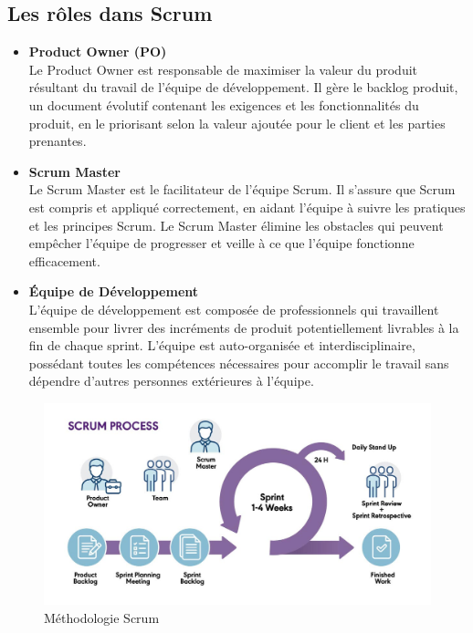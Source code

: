 \documentclass[a4paper, 11pt, openany]{report}
\begin{document}
\subsection{Les rôles dans Scrum}

\begin{itemize}
    \item \textbf{Product Owner (PO)} \\
    Le Product Owner est responsable de maximiser la valeur du produit résultant du travail de l'équipe de développement. Il gère le backlog produit, un document évolutif contenant les exigences et les fonctionnalités du produit, en le priorisant selon la valeur ajoutée pour le client et les parties prenantes.
    
    \item \textbf{Scrum Master} \\
    Le Scrum Master est le facilitateur de l'équipe Scrum. Il s'assure que Scrum est compris et appliqué correctement, en aidant l'équipe à suivre les pratiques et les principes Scrum. Le Scrum Master élimine les obstacles qui peuvent empêcher l'équipe de progresser et veille à ce que l'équipe fonctionne efficacement.
    
    \item \textbf{Équipe de Développement} \\
    L'équipe de développement est composée de professionnels qui travaillent ensemble pour livrer des incréments de produit potentiellement livrables à la fin de chaque sprint. L'équipe est auto-organisée et interdisciplinaire, possédant toutes les compétences nécessaires pour accomplir le travail sans dépendre d'autres personnes extérieures à l'équipe.
\end{itemize}

\begin{figure}[H]
\centering
\includegraphics[width=\textwidth]{scrum.jpg}
\caption{Méthodologie Scrum}
\label{fig:méthodologie_scrum}
\end{figure}
\end{document}

